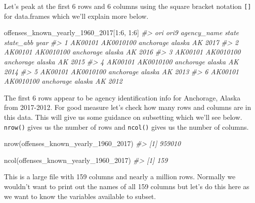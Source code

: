 \documentclass[
  12pt,
]{book}
\newenvironment{Shaded}{\begin{snugshade}}{\end{snugshade}}
\newcommand{\CommentTok}[1]{\textcolor[rgb]{0.37,0.37,0.37}{\textit{#1}}}
\newcommand{\DecValTok}[1]{\textcolor[rgb]{0.06,0.06,0.06}{#1}}
\newcommand{\FunctionTok}[1]{\textcolor[rgb]{0,0,0}{#1}}
\newcommand{\NormalTok}[1]{#1}
\newcommand{\SpecialCharTok}[1]{\textcolor[rgb]{0,0,0}{#1}}
\begin{document}
Let's peak at the first 6 rows and 6 columns using the square bracket notation \texttt{{[}{]}} for data.frames which we'll explain more below.

\begin{Shaded}
\begin{Highlighting}[]
\NormalTok{offenses\_known\_yearly\_1960\_2017[}\DecValTok{1}\SpecialCharTok{:}\DecValTok{6}\NormalTok{, }\DecValTok{1}\SpecialCharTok{:}\DecValTok{6}\NormalTok{]}
\CommentTok{\#\textgreater{}       ori      ori9 agency\_name  state state\_abb year}
\CommentTok{\#\textgreater{} 1 AK00101 AK0010100   anchorage alaska        AK 2017}
\CommentTok{\#\textgreater{} 2 AK00101 AK0010100   anchorage alaska        AK 2016}
\CommentTok{\#\textgreater{} 3 AK00101 AK0010100   anchorage alaska        AK 2015}
\CommentTok{\#\textgreater{} 4 AK00101 AK0010100   anchorage alaska        AK 2014}
\CommentTok{\#\textgreater{} 5 AK00101 AK0010100   anchorage alaska        AK 2013}
\CommentTok{\#\textgreater{} 6 AK00101 AK0010100   anchorage alaska        AK 2012}
\end{Highlighting}
\end{Shaded}

The first 6 rows appear to be agency identification info for Anchorage, Alaska from 2017-2012. For good measure let's check how many rows and columns are in this data. This will give us some guidance on subsetting which we'll see below. \texttt{nrow()} gives us the number of rows and \texttt{ncol()} gives us the number of columns.

\begin{Shaded}
\begin{Highlighting}[]
\FunctionTok{nrow}\NormalTok{(offenses\_known\_yearly\_1960\_2017)}
\CommentTok{\#\textgreater{} [1] 959010}
\end{Highlighting}
\end{Shaded}

\begin{Shaded}
\begin{Highlighting}[]
\FunctionTok{ncol}\NormalTok{(offenses\_known\_yearly\_1960\_2017)}
\CommentTok{\#\textgreater{} [1] 159}
\end{Highlighting}
\end{Shaded}

This is a large file with 159 columns and nearly a million rows. Normally we wouldn't want to print out the names of all 159 columns but let's do this here as we want to know the variables available to subset.
\end{document}
